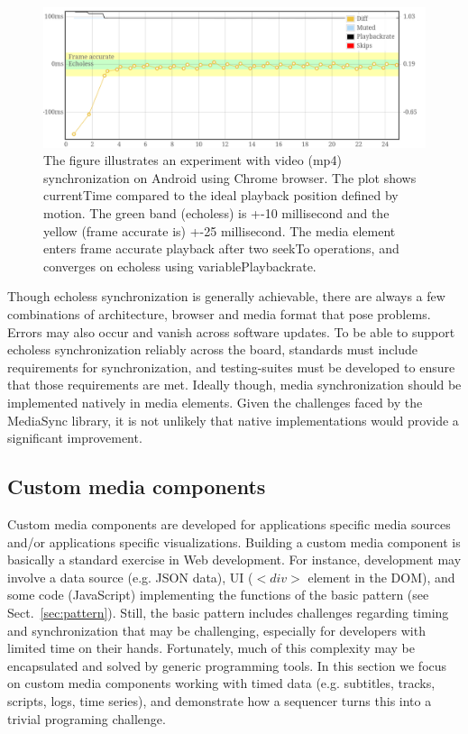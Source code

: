 \begin{figure}[h]
\centering
\includegraphics[scale=.23]{fig/android-video.png}
\caption{The figure illustrates an experiment with video (mp4) synchronization on
Android using Chrome browser. The plot shows currentTime compared to the ideal
playback position defined by motion. The green band (echoless) is +-10 millisecond and
the yellow (frame accurate is) +-25 millisecond. The media element enters frame accurate
playback after two seekTo operations, and converges on echoless using
variablePlaybackrate.}
\label{fig:videosync}
\end{figure}

Though echoless synchronization is generally achievable, there are always a
few combinations of architecture, browser and media format that pose problems.
Errors may also occur and vanish across software updates. To be able to
support echoless synchronization reliably across the board, standards must
include requirements for synchronization, and testing-suites must be developed
to ensure that those requirements are met. Ideally though, media
synchronization should be implemented natively in media elements. Given the
challenges faced by the MediaSync library, it is not unlikely that native
implementations would provide a significant improvement.

\subsection{Custom media components}

Custom media components are developed for applications specific media sources
and/or applications specific visualizations. Building a custom media component
is basically a standard exercise in Web development. For instance, development
may involve a data source (e.g. JSON data), UI ($<div>$ element in the DOM),
and some code (JavaScript) implementing the functions of the basic  pattern
(see Sect.~\ref{sec:pattern}). Still, the basic pattern includes challenges
regarding timing and synchronization that may be challenging, especially for
developers with limited time on their hands. Fortunately, much of this
complexity may be encapsulated and solved by generic programming tools. In
this section we focus on custom media components working with timed data (e.g.
subtitles, tracks, scripts, logs, time series), and demonstrate  how a
sequencer turns this into a trivial programing challenge.

